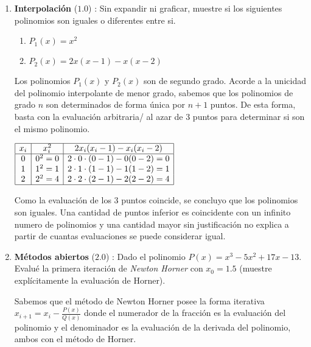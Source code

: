 \documentclass[12pt]{article}
\begin{document}
  \begin{enumerate}[leftmargin=*,widest=9]
    \item \textbf{Interpolación} ($1.0$) : Sin expandir ni graficar, muestre si los siguientes polinomios son iguales o diferentes entre si.
    
    \begin{enumerate}[label=\alph*]
    \item \(P_1(x) = x^2\)
    \item \(P_2(x) = 2x(x-1)-x(x-2)\)
    \end{enumerate}
    
    Los polinomios $P_1(x)$ y $P_2(x)$ son de segundo grado. Acorde a la unicidad del polinomio interpolante de menor grado, sabemos que los polinomios de grado $n$ son determinados de forma única por $n+1$ puntos. De esta forma, basta con la evaluación arbitraria/ al azar de 3 puntos para determinar si son el mismo polinomio.
    \begin{center}
    \(    \begin{array}{|c|c|c|}
    \hline
    x_i & x_i^2 & 2x_i(x_i-1)-x_i(x_i-2)\\
    \hline
    0 & 0^2 = 0 & 2\cdot 0 \cdot (0-1)-0(0-2) = 0 \\
    1 & 1^2 = 1 & 2\cdot 1 \cdot (1-1)-1(1-2) = 1 \\
    2 & 2^2 = 4 & 2\cdot 2 \cdot (2-1)-2(2-2) = 4 \\
    \hline
    \end{array} \)
    \end{center}
    Como la evaluación de los 3 puntos coincide, se concluyo que los polinomios son iguales. Una cantidad de puntos inferior es coincidente con un infinito numero de polinomios y una cantidad mayor sin justificación no explica a partir de cuantas evaluaciones se puede considerar igual.


    \item \textbf{Métodos abiertos} ($2.0$) : Dado el polinomio \(P(x) = x^3 - 5x^2 + 17x -13\). Evalué la primera iteración de \textit{Newton Horner} con \(x_0 = 1.5\) (muestre explícitamente la evaluación de Horner).
    
    Sabemos que el método de Newton Horner posee la forma iterativa \(x_{i+1} = x_i - \frac{P(x)}{Q(x)}\) donde el numerador de la fracción es la evaluación del polinomio y el denominador es la evaluación de la derivada del polinomio, ambos con el método de Horner.


\end{enumerate}
\end{document}
